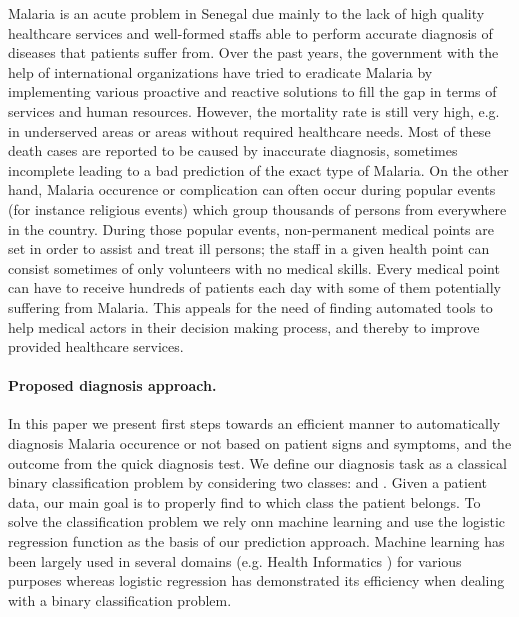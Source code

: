 Malaria is an acute problem in Senegal  due mainly to the lack of high quality healthcare services and well-formed
staffs able to perform accurate diagnosis of diseases that patients suffer from. Over the past years, the government with 
the help of international organizations have tried to eradicate Malaria by implementing various proactive and reactive solutions 
to fill the gap in terms of services and human resources. However, the mortality rate is still very high, e.g. in underserved areas
or areas without required healthcare needs. Most of these death cases are reported to be caused by inaccurate diagnosis, sometimes 
incomplete leading to a bad prediction of the exact type of Malaria.
On the other hand, Malaria occurence or complication can often occur  during  popular events (for instance religious events)
which group thousands of persons from everywhere in the country. During those popular events, non-permanent medical points are set in order
to assist and treat ill persons; the staff in a given health point can consist sometimes of only volunteers with no medical skills. Every medical 
point can have to receive hundreds of patients each day with some of them potentially suffering from Malaria. 
This appeals for the need of finding automated tools to help medical actors in their decision making process, and thereby to improve provided 
healthcare services.   

\paragraph*{Proposed diagnosis approach.}
In this paper we present first steps towards an efficient manner to automatically diagnosis Malaria occurence or not based on patient signs and symptoms,
and the outcome from the quick diagnosis test. We define our diagnosis task as a classical binary classification problem by considering two classes:  and .
Given a patient data, our main goal is to properly find to which class the patient belongs. To solve the classification problem we rely onn machine learning  and use the logistic regression
function as the basis of our prediction approach. Machine learning has been largely used in several domains (e.g. Health Informatics  \cite{Du13}) for various purposes whereas logistic regression has demonstrated its efficiency when dealing with a binary classification problem. 
 
